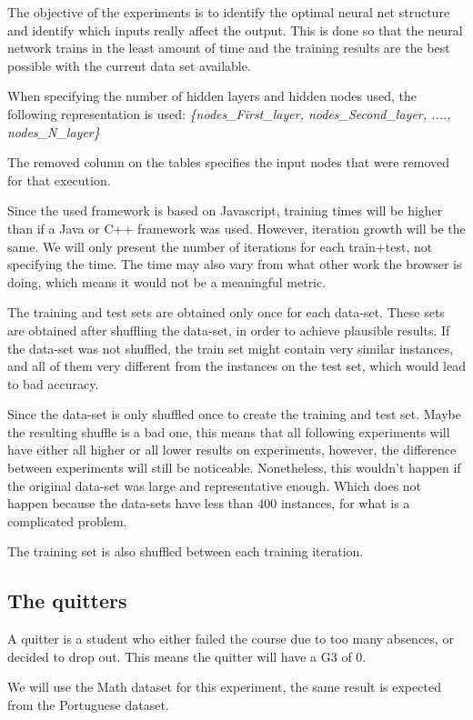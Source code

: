 \documentclass[11pt]{article}
\begin{document}
The objective of the experiments is to identify the optimal neural net structure and identify which inputs really affect the output. This is done so that the neural network trains in the least amount of time and the training results are the best possible with the current data set available.

When specifying the number of hidden layers and hidden nodes used, the following representation is used:
\textit{\{nodes\_First\_layer, nodes\_Second\_layer, ...., nodes\_N\_layer\}}

The removed column on the tables specifies the input nodes that were removed for that execution.

Since the used framework is based on Javascript, training times will be higher than if a Java or C++ framework was used. However, iteration growth will be the same. We will only present the number of iterations for each train+test, not specifying the time. The time may also vary from what other work the browser is doing, which means it would not be a meaningful metric.

The training and test sets are obtained only once for each data-set. These sets are obtained after shuffling the data-set, in order to achieve plausible results. If the data-set was not shuffled, the train set might contain very similar instances, and all of them very different from the instances on the test set, which would lead to bad accuracy.

Since the data-set is only shuffled once to create the training and test set. Maybe the resulting shuffle is a bad one, this means that all following experiments will have either all higher or all lower results on experiments, however, the difference between experiments will still be noticeable. Nonetheless, this wouldn't happen if the original data-set was large and representative enough. Which does not happen because the data-sets have less than 400 instances, for what is a complicated problem.

The training set is also shuffled between each training iteration.

\subsection{The quitters}
A quitter is a student who either failed the course due to too many absences, or decided to drop out. This means the quitter will have a G3 of 0.

We will use the Math dataset for this experiment, the same result is expected from the Portuguese dataset.
\end{document}
